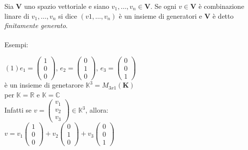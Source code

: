 \documentclass[12pt]{article}
\begin{document}
Sia $\mathbf{V}$ uno spazio vettoriale e siano $v_1, \dots, v_n \in \mathbf{V}$. Se ogni $v \in \mathbf{V}$ è combinazione linare di $v_1, \dots, v_n$ si dice $(v1, \dots,  v_n)$ è un insieme di generatori e $\mathbf{V}$ è detto \textit{finitamente generato}.
\\\\
Esempi:
\begin{center}
    $(1) e_1 = \begin{pmatrix}
    1\\
    0\\
    0
\end{pmatrix}$, $e_2 = \begin{pmatrix}
    0\\
    1\\
    0
\end{pmatrix}$, $e_3 = \begin{pmatrix}
    0\\
    0\\
    1
\end{pmatrix}$\\
è un insieme di genetarore $\mathbb{K}^3 = M_{3x1} (\mathbf{K})$\\
per $\mathbb{K} =\mathbb{R}$  e $\mathbb{K} = \mathbb{C}$\\
Infatti se $v = \begin{pmatrix}
    v_1\\
    v_2\\
    v_3
\end{pmatrix} \in \mathbb{K}^3$, allora:\\
$v = v_1 \begin{pmatrix}
    1\\
    0\\
    0
\end{pmatrix} + v_2 \begin{pmatrix}
    0\\
    1\\
    0
\end{pmatrix} + v_3 \begin{pmatrix}
    0\\
    0\\
    1
\end{pmatrix}$
\end{center}
\end{document}
